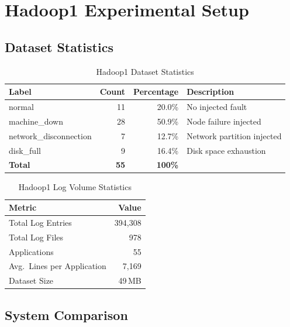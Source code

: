 \section{Hadoop1 Experimental Setup}

\subsection{Dataset Statistics}

\begin{table}[H]
\centering
\caption{Hadoop1 Dataset Statistics}
\label{tab:hadoop1-dataset}
\begin{tabular}{lrrl}
\toprule
\textbf{Label} & \textbf{Count} & \textbf{Percentage} & \textbf{Description} \\
\midrule
normal                 & 11 & 20.0\%  & No injected fault \\
machine\_down          & 28 & 50.9\%  & Node failure injected \\
network\_disconnection & 7  & 12.7\%  & Network partition injected \\
disk\_full             & 9  & 16.4\%  & Disk space exhaustion \\
\midrule
\textbf{Total}         & \textbf{55} & \textbf{100\%} & \\
\bottomrule
\end{tabular}
\end{table}

\begin{table}[H]
\centering
\caption{Hadoop1 Log Volume Statistics}
\label{tab:hadoop1-volume}
\begin{tabular}{lr}
\toprule
\textbf{Metric} & \textbf{Value} \\
\midrule
Total Log Entries           & 394,308 \\
Total Log Files             & 978     \\
Applications                & 55      \\
Avg.\ Lines per Application & 7,169   \\
Dataset Size                & 49\,MB  \\
\bottomrule
\end{tabular}
\end{table}

\subsection{System Comparison}

